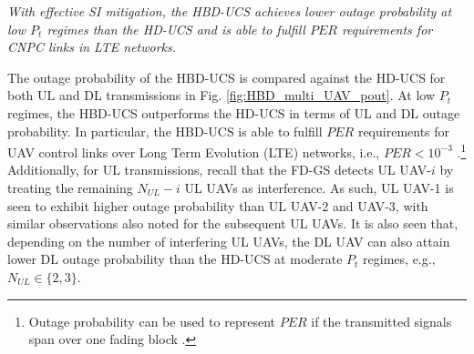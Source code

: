
\begin{observation}
\emph{\emph{With effective SI mitigation, the HBD-UCS achieves lower outage probability at low $P_t$ regimes than the HD-UCS and is able to fulfill $PER$ requirements for CNPC links in LTE networks.}}
\end{observation}

The outage probability of the HBD-UCS is compared against the HD-UCS for both UL and DL transmissions in Fig. \ref{fig:HBD_multi_UAV_pout}. At low $P_t$ regimes, the HBD-UCS outperforms the HD-UCS in terms of UL and DL outage probability. In particular, the HBD-UCS is able to fulfill $PER$ requirements for UAV control links over Long Term Evolution (LTE) networks, i.e., $PER<10^{-3}$ \cite{tr362017}.\footnote{Outage probability can be used to represent $PER$ if the transmitted signals span over one fading block \cite{ernest2019outage}.} Additionally, for UL transmissions, recall that the FD-GS detects UL UAV-$i$ by treating the remaining $N_{UL}-i$ UL UAVs as interference. As such, UL UAV-1 is seen to exhibit higher outage probability than UL UAV-2 and UAV-3, with similar observations also noted for the subsequent UL UAVs. It is also seen that, depending on the number of interfering UL UAVs, the DL UAV can also attain lower DL outage probability than the HD-UCS at moderate $P_t$ regimes, e.g., $N_{UL}\in \{2,3\}$. 

